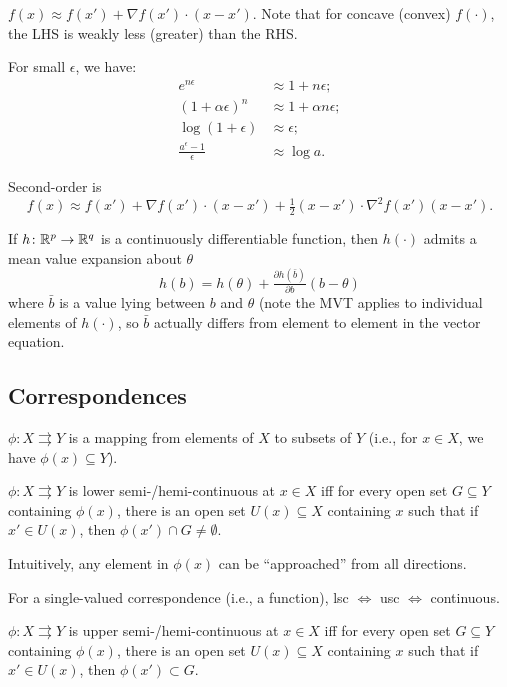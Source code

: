 \documentclass[8pt,letterpaper, landscape]{extarticle} %
\renewcommand{\ln}{\log}
\begin{document}
\begin{multicols}{3}
\begin{description}
$ f(x) \approx f(x') + \nabla f(x') \cdot (x - x') $. Note that for concave (convex) $ f (\cdot) $, the LHS is weakly less (greater) than the RHS.

For small $ \epsilon $, we have:
\begin{align*}
e^{n \epsilon} &\approx 1 + n \epsilon; \\
(1 + \alpha \epsilon)^n &\approx 1 + \alpha n \epsilon; \\
\ln (1+\epsilon) &\approx \epsilon; \\
\frac{a^\epsilon - 1}{\epsilon} &\approx \log a .
\end{align*}

Second-order is
\[ f(x) \approx f(x') + \nabla f(x') \cdot (x - x') + \tfrac{1}{2} (x - x') \cdot \nabla^2 f(x') (x - x') .  \]

 If $ h \colon \mathbb{R}^p \to \mathbb{R}^q $ is a continuously differentiable function, then $ h(\cdot) $ admits a mean value expansion about $ \theta $
$$ h(b) = h(\theta) + \tfrac{\partial h (\bar{b})}{\partial b} (b - \theta) $$
where $ \bar{b} $ is a value lying between $ b $ and $ \theta $ (note the MVT applies to individual elements of $ h(\cdot) $, so $ \bar{b} $ actually differs from element to element in the vector equation.

\subsection{Correspondences}
 $ \phi \colon X \rightrightarrows Y $ is a mapping from elements of $ X $ to subsets of $ Y $ (i.e., for $ x \in X $, we have $ \phi(x) \subseteq Y $).

 $ \phi \colon X \rightrightarrows Y $ is lower semi-/hemi-continuous at $ x \in X $ iff for every open set $ G \subseteq Y  $ containing $ \phi(x) $, there is an open set $ U(x) \subseteq X $ containing $ x $ such that if $ x' \in U(x) $, then $ \phi (x') \cap G \neq \emptyset $.

Intuitively, any element in $ \phi (x) $ can be ``approached'' from all directions.

For a single-valued correspondence (i.e., a function), lsc $ \iff $ usc $ \iff $ continuous.

 $ \phi \colon X \rightrightarrows Y $ is upper semi-/hemi-continuous at $ x \in X $ iff for every open set $ G \subseteq Y  $ containing $ \phi(x) $, there is an open set $ U(x) \subseteq X $ containing $ x $ such that if $ x' \in U(x) $, then $ \phi (x') \subset G $.


\end{description}
\end{multicols}
\end{document}

